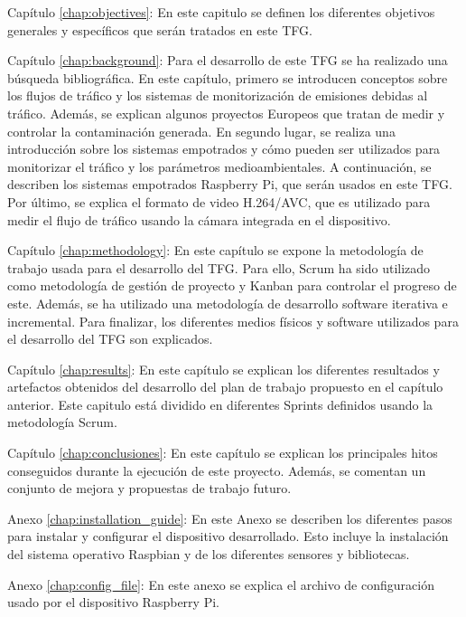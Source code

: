\begin{definitionlist}
	\item[Capítulo \ref{chap:objectives}: \nameref{chap:objectives}] En este capitulo se definen los diferentes objetivos generales y específicos que serán tratados en este \ac{TFG}.
	
	\item[Capítulo \ref{chap:background}: \nameref{chap:background}] Para el desarrollo de este \ac{TFG} se ha realizado una búsqueda bibliográfica. En este capítulo, primero se introducen conceptos sobre los flujos de tráfico y los sistemas de monitorización de emisiones debidas al tráfico. Además, se explican algunos proyectos Europeos que tratan de medir y controlar la contaminación generada. En segundo lugar, se realiza una introducción sobre los sistemas empotrados y cómo pueden ser utilizados para monitorizar el tráfico y los parámetros medioambientales. A continuación, se describen los sistemas empotrados Raspberry Pi, que serán usados en este \ac{TFG}. Por último, se explica el formato de video H.264/AVC, que es utilizado para medir el flujo de tráfico usando la cámara integrada en el dispositivo.
	
	\item[Capítulo \ref{chap:methodology}: \nameref{chap:methodology}] En este capítulo se expone la metodología de trabajo usada para el desarrollo del \ac{TFG}. Para ello, Scrum ha sido utilizado como metodología de gestión de proyecto y Kanban para controlar el progreso de este. Además, se ha utilizado una metodología de desarrollo software iterativa e incremental. Para finalizar, los diferentes medios físicos y software utilizados para el desarrollo del \ac{TFG} son explicados. 
	
	\item[Capítulo \ref{chap:results}: \nameref{chap:results}] En este capítulo se explican los diferentes resultados y artefactos obtenidos del desarrollo del plan de trabajo propuesto en el capítulo anterior. Este capitulo está dividido en diferentes Sprints definidos usando la metodología Scrum.
	
	\item[Capítulo \ref{chap:conclusiones}: \nameref{chap:conclusiones}] En este capítulo se explican los principales hitos conseguidos durante la ejecución de este proyecto. Además, se comentan un conjunto de mejora y propuestas de trabajo futuro.
	
	\item[Anexo \ref{chap:installation_guide}: \nameref{chap:installation_guide}] En este Anexo se describen los diferentes pasos para instalar y configurar el dispositivo desarrollado. Esto incluye la instalación del sistema operativo Raspbian y de los diferentes sensores y bibliotecas.
	
	\item[Anexo \ref{chap:config_file}: \nameref{chap:config_file}] En este anexo se explica el archivo de configuración usado por el dispositivo Raspberry Pi.
	
\end{definitionlist}
